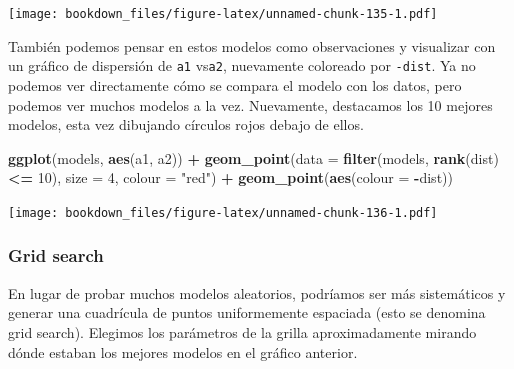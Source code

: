 \documentclass[]{book}
\newenvironment{Shaded}{\begin{snugshade}}{\end{snugshade}}
\newcommand{\DataTypeTok}[1]{\textcolor[rgb]{0.13,0.29,0.53}{#1}}
\newcommand{\DecValTok}[1]{\textcolor[rgb]{0.00,0.00,0.81}{#1}}
\newcommand{\KeywordTok}[1]{\textcolor[rgb]{0.13,0.29,0.53}{\textbf{#1}}}
\newcommand{\NormalTok}[1]{#1}
\newcommand{\OperatorTok}[1]{\textcolor[rgb]{0.81,0.36,0.00}{\textbf{#1}}}
\newcommand{\StringTok}[1]{\textcolor[rgb]{0.31,0.60,0.02}{#1}}
\begin{document}
\texttt{[image: bookdown\_files/figure-latex/unnamed-chunk-135-1.pdf]}

También podemos pensar en estos modelos como observaciones y visualizar con un gráfico de dispersión de \texttt{a1} vs\texttt{a2}, nuevamente coloreado por \texttt{-dist}. Ya no podemos ver directamente cómo se compara el modelo con los datos, pero podemos ver muchos modelos a la vez. Nuevamente, destacamos los 10 mejores modelos, esta vez dibujando círculos rojos debajo de ellos.

\begin{Shaded}
\begin{Highlighting}[]
\KeywordTok{ggplot}\NormalTok{(models, }\KeywordTok{aes}\NormalTok{(a1, a2)) }\OperatorTok{+}
\StringTok{  }\KeywordTok{geom_point}\NormalTok{(}\DataTypeTok{data =} \KeywordTok{filter}\NormalTok{(models, }\KeywordTok{rank}\NormalTok{(dist) }\OperatorTok{<=}\StringTok{ }\DecValTok{10}\NormalTok{), }\DataTypeTok{size =} \DecValTok{4}\NormalTok{, }\DataTypeTok{colour =} \StringTok{"red"}\NormalTok{) }\OperatorTok{+}
\StringTok{  }\KeywordTok{geom_point}\NormalTok{(}\KeywordTok{aes}\NormalTok{(}\DataTypeTok{colour =} \OperatorTok{-}\NormalTok{dist))}
\end{Highlighting}
\end{Shaded}

\texttt{[image: bookdown\_files/figure-latex/unnamed-chunk-136-1.pdf]}

\hypertarget{grid-search}{%
\subsubsection{Grid search}\label{grid-search}}

En lugar de probar muchos modelos aleatorios, podríamos ser más sistemáticos y generar una cuadrícula de puntos uniformemente espaciada (esto se denomina grid search). Elegimos los parámetros de la grilla aproximadamente mirando dónde estaban los mejores modelos en el gráfico anterior.
\end{document}
